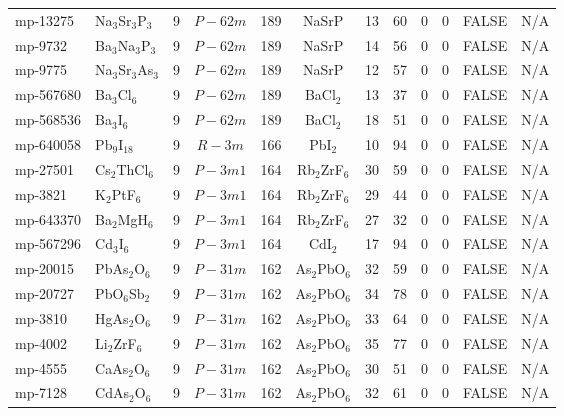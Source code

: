 {\begin{longtable}{llcccccccccc}
    mp-13275 & Na$_{3}$Sr$_{3}$P$_{3}$ & 9     & $P-62m$ & 189   & NaSrP & 13    & 60    & 0     & 0     & FALSE & N/A \\
    mp-9732 & Ba$_{3}$Na$_{3}$P$_{3}$ & 9     & $P-62m$ & 189   & NaSrP & 14    & 56    & 0     & 0     & FALSE & N/A \\
    mp-9775 & Na$_{3}$Sr$_{3}$As$_{3}$ & 9     & $P-62m$ & 189   & NaSrP & 12    & 57    & 0     & 0     & FALSE & N/A \\
    mp-567680 & Ba$_{3}$Cl$_{6}$ & 9     & $P-62m$ & 189   & BaCl$_{2}$ & 13    & 37    & 0     & 0     & FALSE & N/A \\
    mp-568536 & Ba$_{3}$I$_{6}$ & 9     & $P-62m$ & 189   & BaCl$_{2}$ & 18    & 51    & 0     & 0     & FALSE & N/A \\
    mp-640058 & Pb$_{9}$I$_{18}$ & 9     & $R-3m$ & 166   & PbI$_{2}$ & 10    & 94    & 0     & 0     & FALSE & N/A \\
    mp-27501 & Cs$_{2}$ThCl$_{6}$ & 9     & $P-3m1$ & 164   & Rb$_{2}$ZrF$_{6}$ & 30    & 59    & 0     & 0     & FALSE & N/A \\
    mp-3821 & K$_{2}$PtF$_{6}$ & 9     & $P-3m1$ & 164   & Rb$_{2}$ZrF$_{6}$ & 29    & 44    & 0     & 0     & FALSE & N/A \\
    mp-643370 & Ba$_{2}$MgH$_{6}$ & 9     & $P-3m1$ & 164   & Rb$_{2}$ZrF$_{6}$ & 27    & 32    & 0     & 0     & FALSE & N/A \\
    mp-567296 & Cd$_{3}$I$_{6}$ & 9     & $P-3m1$ & 164   & CdI$_{2}$ & 17    & 94    & 0     & 0     & FALSE & N/A \\
    mp-20015 & PbAs$_{2}$O$_{6}$ & 9     & $P-31m$ & 162   & As$_{2}$PbO$_{6}$ & 32    & 59    & 0     & 0     & FALSE & N/A \\
    mp-20727 & PbO$_{6}$Sb$_{2}$ & 9     & $P-31m$ & 162   & As$_{2}$PbO$_{6}$ & 34    & 78    & 0     & 0     & FALSE & N/A \\
    mp-3810 & HgAs$_{2}$O$_{6}$ & 9     & $P-31m$ & 162   & As$_{2}$PbO$_{6}$ & 33    & 64    & 0     & 0     & FALSE & N/A \\
    mp-4002 & Li$_{2}$ZrF$_{6}$ & 9     & $P-31m$ & 162   & As$_{2}$PbO$_{6}$ & 35    & 77    & 0     & 0     & FALSE & N/A \\
    mp-4555 & CaAs$_{2}$O$_{6}$ & 9     & $P-31m$ & 162   & As$_{2}$PbO$_{6}$ & 30    & 51    & 0     & 0     & FALSE & N/A \\
    mp-7128 & CdAs$_{2}$O$_{6}$ & 9     & $P-31m$ & 162   & As$_{2}$PbO$_{6}$ & 32    & 61    & 0     & 0     & FALSE & N/A \\

\end{longtable}}

